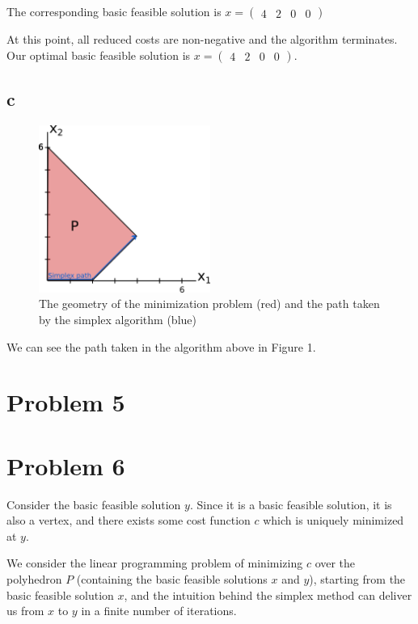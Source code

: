 \documentclass[11pt,a4paper]{article}
\begin{document}
The corresponding basic feasible solution is $x=\begin{pmatrix}4 & 2 & 0 & 0\end{pmatrix}$


At this point, all reduced costs are non-negative and the algorithm terminates. Our optimal basic feasible solution is $x=\begin{pmatrix}4 & 2 & 0 & 0\end{pmatrix}$.

\subsection{c}

\begin{figure}[H]
\includegraphics[width=0.5\textwidth]{4c}
\centering
\caption{The geometry of the minimization problem (red) and the path taken by the simplex algorithm (blue)}
\end{figure}




We can see the path taken in the algorithm above in Figure 1.

\section*{Problem 5}

\section{Problem 6}

Consider the basic feasible solution $y$. Since it is a basic feasible solution, it is also a vertex, and there exists some cost function $c$ which is uniquely minimized at $y$.

We consider the linear programming problem of minimizing $c$ over the polyhedron $P$ (containing the basic feasible solutions $x$ and $y$), starting from the basic feasible solution $x$, and the intuition behind the simplex method can deliver us from $x$ to $y$ in a finite number of iterations.
\end{document}
